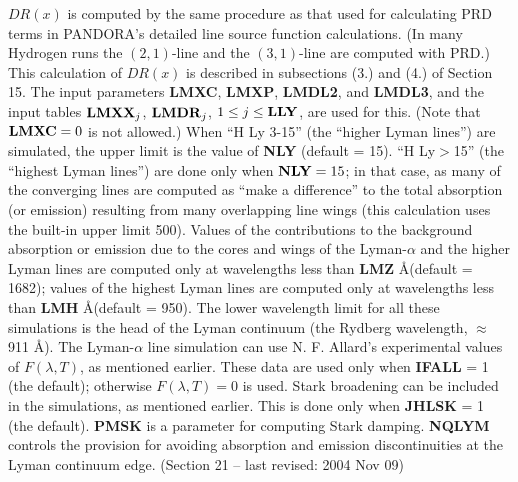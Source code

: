 $DR(x)$ is computed by the same procedure as that used for calculating PRD
terms in PANDORA's detailed line source function calculations. (In many
Hydrogen runs the $(2,1)$-line and the $(3,1)$-line are computed with PRD.)
This calculation of $DR(x)$ is described in subsections (3.) and (4.)
of Section 15. The input parameters {\bf LMXC}, {\bf LMXP}, {\bf LMDL2},
and {\bf LMDL3}, and the input tables ${\bf LMXX}_j$,
${\bf LMDR}_j$, $1 \le j \le {\bf LLY}$, are used for this.
(Note that ${\bf LMXC} = 0$ is not allowed.)
\blankline
When ``H Ly 3-15'' (the ``higher Lyman lines'') are simulated, the upper
limit is the value of {\bf NLY} (default = 15). ``H Ly$>$15'' (the
``highest Lyman lines'') are done only when ${\bf NLY} = 15$; in that
case, as many of the converging lines are computed as ``make a difference''
to the total absorption (or emission) resulting from many overlapping line
wings (this calculation uses the built-in upper limit 500).
\blankline
Values of the contributions to the background absorption or emission due
to the cores and wings of the Lyman-$\alpha$ and the higher Lyman lines
are computed only at wavelengths less than {\bf LMZ} \AA (default = 1682);
values of the highest Lyman lines are computed only at wavelengths less
than {\bf LMH} \AA (default = 950). The lower wavelength limit for all
these simulations is the head of the Lyman continuum (the Rydberg
wavelength, $\approx$ 911 \AA).
\blankline
The Lyman-$\alpha$ line simulation can use N. F. Allard's experimental
values of $F(\lambda,T)$, as mentioned earlier. These data are used only
when {\bf IFALL} = 1 (the default); otherwise $F(\lambda,T) = 0$ 
is used.
\blankline
Stark broadening can be included in the simulations, as mentioned earlier.
This is done only when {\bf JHLSK} = 1 (the default). {\bf PMSK} is
a parameter for computing Stark damping.
\blankline
{\bf NQLYM} controls the provision for avoiding absorption and emission
discontinuities at the Lyman continuum edge.
\vfill
\noindent (Section 21 -- last revised: 2004 Nov 09)%
{}
\ej
